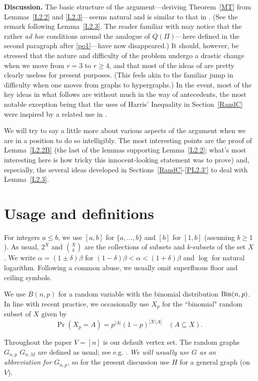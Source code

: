 \documentclass[letterpaper,11pt]{article}
\newcommand{\beq}[1]{\begin{equation}\label{#1}}
\newcommand{\enq}[0]{\end{equation}}
\newcommand{\mn}[0]{\medskip\noindent}
\newcommand{\sub}[0]{\subseteq}
\newcommand{\sm}[0]{\setminus}
\renewcommand{\dots}[0]{,\ldots,}
\newcommand{\0}[0]{\emptyset}
\newcommand{\C}[2]{{{#1}\choose{{#2}}}}
\newcommand{\ga}[0]{\alpha }
\newcommand{\gb}[0]{\beta }
\newcommand{\gd}[0]{\delta }
\begin{document}
\mn
{\bf Discussion.}
The basic structure of the argument---deriving Theorem~\ref{MT} from
Lemmas~\ref{L2.2} and \ref{L2.3}---seems natural
and is similar to that in
\cite{Mantel}.
%
(See the remark following Lemma~\ref{L2.3}.
The reader familiar with \cite{Mantel} may notice that the
rather {\em ad hoc} conditions around the analogue of
$Q(\Pi)$---here defined in
the second paragraph after \eqref{po1}---have now
disappeared.)
%
It should, however, be stressed
that the nature and
difficulty of the problem undergo a drastic change
when we move from $r=3$ to $r\geq 4$, and that most of the ideas
of \cite{Mantel} are pretty clearly useless for present
purposes.  (This feels
akin to the familiar jump in difficulty
when one moves from graphs to hypergraphs.)
In the event, most of the
key ideas in what follows are without much in the way of antecedents,
the most notable exception being that the uses of
Harris' Inequality in Section~\ref{RandC} were inspired by a
related use in \cite{BPS}.

We will try to say a little more about various aspects
of the argument when we are in a position to do so intelligibly.
%
%
The most interesting points
are the proof of
Lemma~\ref{L2.2B} (the last of the lemmas supporting
Lemma~\ref{L2.2};
what's most interesting here is how tricky
this innocent-looking statement was to prove)
and, especially, the several ideas developed in
Sections~\ref{RandC}-\ref{PL2.3'} to deal with
Lemma~\ref{L2.3}.




\section{Usage and definitions}\label{Usage}

%
For integers $a\leq b$, we use
$[a,b]$ for $\{a\dots b\}$ and $[b]$
for $[1,b]$ (assuming $b\geq 1$).
As usual, $2^X$ and $\C{X}{k}$ are
the collections of subsets and $k$-subsets of the set $X$.
We write
$\ga=(1\pm \gd)\gb$ for $(1-\gd)\gb<\ga<(1+\gd )\gb$
and $\log $ for natural logarithm.
Following a common abuse, we usually omit superfluous
floor and ceiling symbols.
%

We use
$B(n,p)$ for a random variable with the binomial
distribution ${\rm Bin}(n,p)$.
In line with recent practice, we occasionally use
$X_p$ for the ``binomial" random subset of $X$
given by
\beq{Xp}
\Pr(X_p=A) = p^{|A|}(1-p)^{|X\sm A|} ~~ ~~( A\sub X).
\enq



Throughout the paper $V=[n]$ %
is our default
vertex set.
%
The random graphs $G_{n,p}$
$G_{n,M}$
are defined as usual; see e.g. \cite{JLR}.
%
{\em We will usually use $G$ as an abbreviation for
$G_{n,p}$,}
so for the present discussion use $H$ for a general graph (on $V$).
\end{document}
